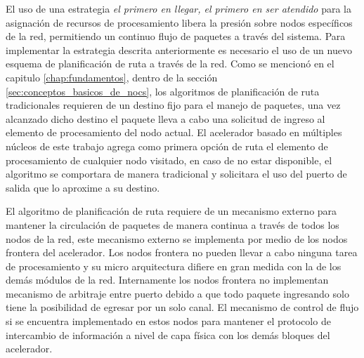 El uso de una estrategia \textit{el primero en llegar, el primero en ser atendido} para la asignación de recursos de procesamiento libera la presión sobre nodos específicos de la red, permitiendo un continuo flujo de paquetes a través del sistema. Para implementar la estrategia descrita anteriormente es necesario el uso de un nuevo esquema de planificación de ruta a través de la red. Como se mencionó en el capitulo \ref{chap:fundamentos}, dentro de la sección \ref{sec:conceptos_basicos_de_nocs}, los algoritmos de planificación de ruta tradicionales requieren de un destino fijo para el manejo de paquetes, una vez alcanzado dicho destino el paquete lleva a cabo una solicitud de ingreso al elemento de procesamiento del nodo actual. El acelerador basado en múltiples núcleos de este trabajo agrega como primera opción de ruta el elemento de procesamiento de cualquier nodo visitado, en caso de no estar disponible, el algoritmo se comportara de manera tradicional y solicitara el uso del puerto de salida que lo aproxime a su destino.

El algoritmo de planificación de ruta requiere de un mecanismo externo para mantener la circulación de paquetes de manera continua a través de todos los nodos de la red, este mecanismo externo se implementa por medio de los nodos frontera del acelerador. Los nodos frontera no pueden llevar a cabo ninguna tarea de procesamiento y su micro arquitectura difiere en gran medida con la de los demás módulos de la red. Internamente los nodos frontera no implementan mecanismo de arbitraje entre puerto debido a que todo paquete ingresando solo tiene la posibilidad de egresar por un solo canal. El mecanismo de control de flujo si se encuentra implementado en estos nodos para mantener el protocolo de intercambio de información a nivel de capa física con los demás bloques del acelerador. 

